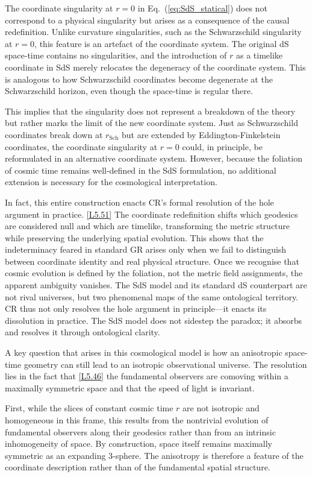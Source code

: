 \documentclass[12pt]{book}
\newcounter{logicanchor}
\newenvironment{logicanchorenv}[1]{\refstepcounter{logicanchor}\label{#1}}{}
\newcommand{\logiclink}[2]{\begin{logicanchorenv}{logic:#1}\end{logicanchorenv}\hyperref[appendix:#1]{[#1]}\xspace}
\begin{document}
The coordinate singularity at $r=0$ in Eq.~(\ref{eq:SdS_statical}) does not correspond to a physical singularity but arises as a consequence of the causal redefinition. Unlike curvature singularities, such as the Schwarzschild singularity at $r=0$, this feature is an artefact of the coordinate system. The original dS space-time contains no singularities, and the introduction of $r$ as a timelike coordinate in SdS merely relocates the degeneracy of the coordinate system. This is analogous to how Schwarzschild coordinates become degenerate at the Schwarzschild horizon, even though the space-time is regular there.

This implies that the singularity does not represent a breakdown of the theory but rather marks the limit of the new coordinate system. Just as Schwarzschild coordinates break down at $r_{\mathrm{Sch}}$ but are extended by Eddington-Finkelstein coordinates, the coordinate singularity at $r=0$ could, in principle, be reformulated in an alternative coordinate system. However, because the foliation of cosmic time remains well-defined in the SdS formulation, no additional extension is necessary for the cosmological interpretation.

In fact, this entire construction enacts CR's formal resolution of the hole argument in practice. \logiclink{L5.51}{} The coordinate redefinition shifts which geodesics are considered null and which are timelike, transforming the metric structure while preserving the underlying spatial evolution. This shows that the indeterminacy feared in standard GR arises only when we fail to distinguish between coordinate identity and real physical structure. Once we recognise that cosmic evolution is defined by the foliation, not the metric field assignments, the apparent ambiguity vanishes. The SdS model and its standard dS counterpart are not rival universes, but two phenomenal maps of the same ontological territory. CR thus not only resolves the hole argument in principle---it enacts its dissolution in practice. The SdS model does not sidestep the paradox; it absorbs and resolves it through ontological clarity.

A key question that arises in this cosmological model is how an anisotropic space-time geometry can still lead to an isotropic observational universe. The resolution lies in the fact that \logiclink{L5.46}{} the fundamental observers are comoving within a maximally symmetric space and that the speed of light is invariant.

First, while the slices of constant cosmic time $r$ are not isotropic and homogeneous in this frame, this results from the nontrivial evolution of fundamental observers along their geodesics rather than from an intrinsic inhomogeneity of space. By construction, space itself remains maximally symmetric as an expanding 3-sphere. The anisotropy is therefore a feature of the coordinate description rather than of the fundamental spatial structure.
\end{document}
